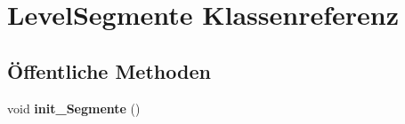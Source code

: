 \hypertarget{class_level_segmente}{\section{Level\-Segmente Klassenreferenz}
\label{class_level_segmente}
}
\subsection*{Öffentliche Methoden}
\begin{DoxyCompactItemize}
\item 
\hypertarget{class_level_segmente_a076dcbcdfeb93b6af1f75dcdd34bf6d2}{void {\bfseries init\-\_\-\-Segmente} ()}\label{class_level_segmente_a076dcbcdfeb93b6af1f75dcdd34bf6d2}

\end{DoxyCompactItemize}
